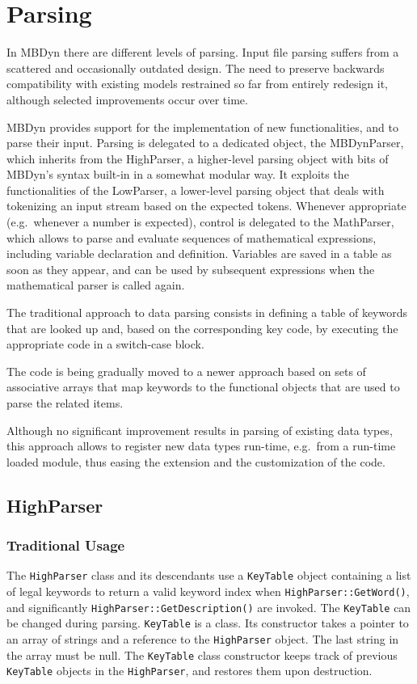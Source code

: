 \documentclass[10pt,dvips,fleqn,subeqn]{report}
\begin{document}
\chapter{Parsing}
In MBDyn there are different levels of parsing.
Input file parsing suffers from a scattered and occasionally outdated design.
The need to preserve backwards compatibility with existing models
restrained so far from entirely redesign it, although selected improvements
occur over time.

MBDyn provides support for the implementation of new functionalities,
and to parse their input.
Parsing is delegated to a dedicated object, the MBDynParser, which
inherits from the HighParser, a higher-level parsing object 
with bits of MBDyn's syntax built-in in a somewhat modular way.
It exploits the functionalities of the LowParser, a lower-level
parsing object that deals with tokenizing an input stream
based on the expected tokens.
Whenever appropriate (e.g.\ whenever a number is expected),
control is delegated to the MathParser, which allows to parse and evaluate
sequences of mathematical expressions, including variable declaration
and definition.
Variables are saved in a table as soon as they appear, and can be
used by subsequent expressions when the mathematical parser is called again.

The traditional approach to data parsing consists in defining a table
of keywords that are looked up and, based on the corresponding key code,
by executing the appropriate code in a switch-case block.

The code is being gradually moved to a newer approach based on sets
of associative arrays that map keywords to the functional objects
that are used to parse the related items.

Although no significant improvement results in parsing of existing 
data types, this approach allows to register new data types run-time,
e.g.\ from a run-time loaded module, thus easing the extension
and the customization of the code.


\section{HighParser}
\subsection{Traditional Usage}
The \texttt{HighParser} class and its descendants use a \texttt{KeyTable}
object containing a list of legal keywords to return a valid keyword index
when \texttt{HighParser::GetWord()}, and significantly 
\texttt{HighParser::GetDescription()} are invoked.
The \texttt{KeyTable} can be changed during parsing.
\texttt{KeyTable} is a class.
Its constructor takes a pointer to an array of strings and a reference 
to the \texttt{HighParser} object.
The last string in the array must be null.
The \texttt{KeyTable} class constructor keeps track 
of previous \texttt{KeyTable} objects in the \texttt{HighParser}, 
and restores them upon destruction.
\end{document}
